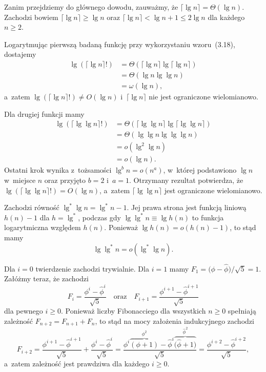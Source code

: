Zanim przejdziemy do głównego dowodu, zauważmy, że $\lceil\lg n\rceil=\Theta(\lg n)$. Zachodzi bowiem $\lceil\lg n\rceil\ge\lg n$ oraz $\lceil\lg n\rceil<\lg n+1\le2\lg n$ dla każdego $n\ge2$.

Logarytmując pierwszą badaną funkcję przy wykorzystaniu wzoru~(3.18), dostajemy
\begin{align*}
	\lg(\lceil\lg n\rceil!) &= \Theta(\lceil\lg n\rceil\lg\lceil\lg n\rceil) \\
	&= \Theta(\lg n\lg\lg n) \\
	&= \omega(\lg n),
\end{align*}
a~zatem $\lg(\lceil\lg n\rceil!)\ne O(\lg n)$ i~$\lceil\lg n\rceil$ nie jest ograniczone wielomianowo.

Dla drugiej funkcji mamy
\begin{align*}
	\lg(\lceil\lg\lg n\rceil!) &= \Theta(\lceil\lg\lg n\rceil\lg\lceil\lg\lg n\rceil) \\
	&= \Theta(\lg\lg n\lg\lg\lg n) \\
	&= o(\lg^2\lg n) \\
	&= o(\lg n).
\end{align*}
Ostatni krok wynika z~tożsamości $\lg^bn=o(n^a)$, w~której podstawiono $\lg n$ w~miejsce $n$ oraz przyjęto $b=2$ i~$a=1$. Otrzymany rezultat potwierdza, że $\lg(\lceil\lg\lg n\rceil!)=O(\lg n)$, a~zatem $\lceil\lg\lg n\rceil$ jest ograniczone wielomianowo.

\exercise %
Zachodzi równość $\lg^*\lg n=\lg^*n-1$. Jej prawa strona jest funkcją liniową $h(n)-1$ dla $h=\lg^*$, podczas gdy $\lg\lg^*n\equiv\lg h(n)$ to funkcja logarytmiczna względem $h(n)$. Ponieważ $\lg h(n)=o(h(n)-1)$, to stąd mamy
\[
	\lg\lg^*n = o(\lg^*\lg n).
\]

\exercise %
Dla $i=0$ twierdzenie zachodzi trywialnie. Dla $i=1$ mamy $F_1=\bigl(\phi-\widehat\phi\bigr)/\sqrt{5}=1$. Załóżmy teraz, że zachodzi
\[
	F_i = \frac{\phi^i-\widehat\phi^i}{\sqrt{5}} \quad\text{oraz}\quad F_{i+1} = \frac{\phi^{i+1}-\widehat\phi^{i+1}}{\sqrt{5}}
\]
dla pewnego $i\ge0$. Ponieważ liczby Fibonacciego dla wszystkich $n\ge0$ spełniają zależność $F_{n+2}=F_{n+1}+F_n$, to stąd na mocy założenia indukcyjnego zachodzi
\[
	F_{i+2} = \frac{\phi^{i+1}-\widehat\phi^{i+1}}{\sqrt{5}}+\frac{\phi^i-\widehat\phi^i}{\sqrt{5}} = \frac{\phi^i\overbrace{(\phi+1)}^{\phi^2}-\widehat\phi^i\overbrace{\bigl(\widehat\phi+1\bigr)}^{\widehat\phi^2}}{\sqrt{5}} = \frac{\phi^{i+2}-\widehat\phi^{i+2}}{\sqrt{5}},
\]
a~zatem zależność jest prawdziwa dla każdego $i\ge0$.

